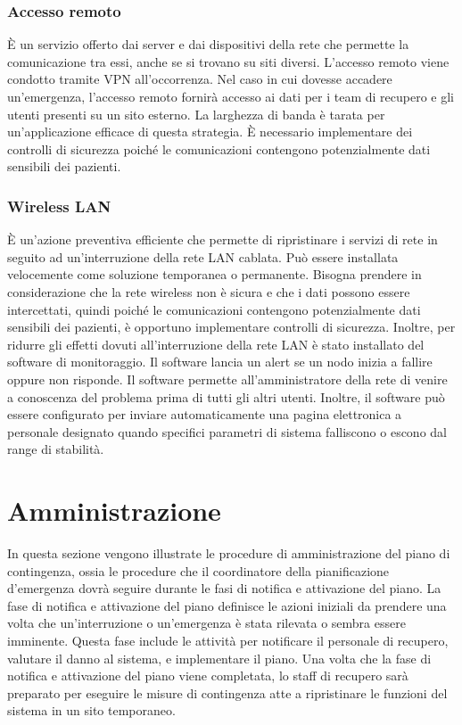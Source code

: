 \documentclass[12pt, a4paper, titlepage]{report}
\begin{document}
	\subsubsection{Accesso remoto}

		È un servizio offerto dai server e dai dispositivi della rete che permette la comunicazione tra essi, anche se si trovano su siti diversi. L'accesso remoto viene condotto tramite VPN all'occorrenza. Nel caso in cui dovesse accadere un'emergenza, l'accesso remoto fornirà accesso ai dati per i team di recupero e gli utenti presenti su un sito esterno. La larghezza di banda è tarata per un'applicazione efficace di questa strategia. È necessario implementare dei controlli di sicurezza poiché le comunicazioni contengono potenzialmente dati sensibili dei pazienti.
	
	\subsubsection{Wireless LAN}

	È un'azione preventiva efficiente che permette di ripristinare i servizi di rete in seguito ad un'interruzione della rete LAN cablata. Può essere installata velocemente come soluzione temporanea o permanente. Bisogna prendere in considerazione che la rete wireless non è sicura e che i dati possono essere intercettati, quindi poiché le comunicazioni contengono potenzialmente dati sensibili dei pazienti, è opportuno implementare controlli di sicurezza.
	Inoltre, per ridurre gli effetti dovuti all'interruzione della rete LAN è stato installato del software di monitoraggio. Il software lancia un alert se un nodo inizia a fallire oppure non risponde. Il software permette all'amministratore della rete di venire a conoscenza del problema prima di tutti gli altri utenti. Inoltre, il software può essere configurato per inviare automaticamente una pagina elettronica a personale designato quando specifici parametri di sistema falliscono o escono dal range di stabilità.
	
	\newpage
	
	\section{Amministrazione}
	
	In questa sezione vengono illustrate le procedure di amministrazione del piano di contingenza, ossia le procedure che il coordinatore della pianificazione d'emergenza dovrà seguire durante le fasi di notifica e attivazione del piano. La fase di notifica e attivazione del piano definisce le azioni iniziali da prendere una volta che un'interruzione o un'emergenza è stata rilevata o sembra essere imminente. Questa fase include le attività per notificare il personale di recupero, valutare il danno al sistema, e implementare il piano. Una volta che la fase di notifica e attivazione del piano viene completata, lo staff di recupero sarà preparato per eseguire le misure di contingenza atte a ripristinare le funzioni del sistema in un sito temporaneo.
	
\end{document}
